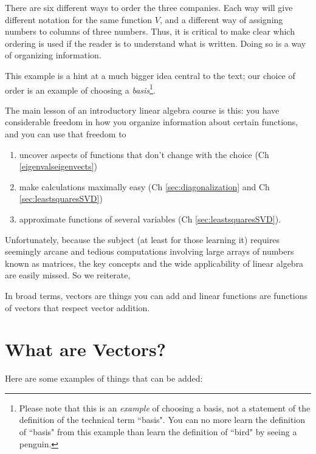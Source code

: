 \begin{example}
There are six different ways to order the three companies. 
Each way will give different notation for the same function $V$, and a different way of assigning numbers to columns of three numbers. 
Thus, it is critical to make clear which ordering is used if the reader is to understand what is written. 
Doing so is a way of organizing information. 

This example is a hint at a much bigger idea central to the text; 
our choice of order is an example of choosing a {\it basis}\footnote{
Please note that this is an {\it example} of choosing a basis, 
not a statement of the definition of the technical term ``basis". 
You can no more learn the definition of ``basis"  from this example 
than learn the definition of  ``bird" by seeing a penguin.}\!\!. 
\end{example}

The main lesson of an introductory linear algebra course is this: 
you have considerable freedom in how you organize information about certain functions, 
and you can use that  freedom to 
\begin{enumerate}
\item uncover aspects of functions that don't change with the choice (Ch \ref{eigenvalseigenvects})
\item make calculations maximally easy (Ch \ref{sec:diagonalization}  and Ch \ref{sec:leastsquaresSVD}) 
\item approximate functions of several variables (Ch \ref{sec:leastsquaresSVD}).
\end{enumerate}
Unfortunately, because the subject (at least for those learning it) requires seemingly arcane and tedious computations
involving large arrays of numbers known as matrices, the key concepts and the wide applicability of linear algebra are
easily missed. So we reiterate, 

\vspace{3mm}
\vspace{3mm}

\noindent In broad terms, vectors are things you can add and  linear functions are 
functions of vectors that respect vector addition. 



\noindent 
\section{What are Vectors?}
Here are some examples of things that can be added:

